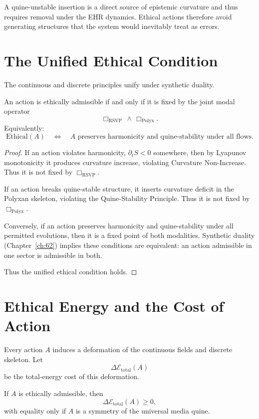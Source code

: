 A quine-unstable insertion is a direct source of epistemic curvature and
thus requires removal under the EHR dynamics.
Ethical actions therefore avoid generating structures that the system
would inevitably treat as errors.

\section{The Unified Ethical Condition}

The continuous and discrete principles unify under synthetic duality.

\begin{theorem}
\label{thm:unified-ethics}
An action is ethically admissible if and only if it is fixed by the
joint modal operator
\[
\Box_{\mathrm{RSVP}} \,\wedge\, \Box_{\mathrm{Polyx}}.
\]
Equivalently:
\[
\text{Ethical}(A)
\quad\Longleftrightarrow\quad
A \text{ preserves harmonicity and quine-stability under all flows.}
\]
\end{theorem}

\begin{proof}
If an action violates harmonicity, $\partial_t S < 0$ somewhere,
then by Lyapunov monotonicity it produces curvature increase, violating
Curvature Non-Increase.
Thus it is not fixed by $\Box_{\mathrm{RSVP}}$.

If an action breaks quine-stable structure, it inserts curvature deficit
in the Polyxan skeleton, violating the Quine-Stability Principle.
Thus it is not fixed by $\Box_{\mathrm{Polyx}}$.

Conversely, if an action preserves harmonicity and quine-stability under
all permitted evolutions, then it is a fixed point of both modalities.
Synthetic duality (Chapter~\ref{ch:62}) implies these conditions are
equivalent: an action admissible in one sector is admissible in both.

Thus the unified ethical condition holds.
\end{proof}

\section{Ethical Energy and the Cost of Action}

Every action $A$ induces a deformation of the continuous fields and
discrete skeleton.  Let
\[
\Delta \mathcal{E}_{\mathrm{total}}(A)
\]
be the total-energy cost of this deformation.

\begin{proposition}
If $A$ is ethically admissible, then
\[
\Delta \mathcal{E}_{\mathrm{total}}(A) \ge 0,
\]
with equality only if $A$ is a symmetry of the universal media quine.
\end{proposition}

